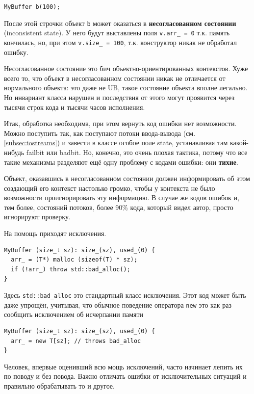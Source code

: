 \documentclass[a4paper,12pt,oneside]{book}
\begin{document}
\begin{lstlisting}
MyBuffer b(100);
\end{lstlisting}

После этой строчки объект \lstinline!b! может оказаться в \textbf{несогласованном состоянии} (inconsistent state). У него будут выставлены поля \lstinline!v.arr_ = 0! т.к. память кончилась, но, при этом \lstinline!v.size_ = 100!, т.к. конструктор никак не обработал ошибку. 

Несогласованное состояние это бич объектно-ориентированных контекстов. Хуже всего то, что объект в несогласованном состоянии никак не отличается от нормального объекта: это даже не UB, такое состояние объекта вполне легально. Но инвариант класса нарушен и последствия от этого могут проявится через тысячи строк кода и тысячи часов исполнения.

Итак, обработка необходима, при этом вернуть код ошибки нет возможности. Можно поступить так, как поступают потоки ввода-вывода (см. \ref{subsec:iostreams}) и завести в классе особое поле state, устанавливая там какой-нибудь failbit или badbit. Но, конечно, это очень плохая тактика, потому что все такие механизмы разделяют ещё одну проблему с кодами ошибки: они \textbf{тихие}.

Объект, оказавшись в несогласованном состоянии должен информировать об этом создающий его контекст настолько громко, чтобы у контекста не было возможности проигнорировать эту информацию. В случае же кодов ошибок и, тем более, состояний потоков, более 90\% кода, который видел автор, просто игнорируют проверку.

На помощь приходят исключения.

\begin{lstlisting}
MyBuffer (size_t sz): size_(sz), used_(0) {
  arr_ = (T*) malloc (sizeof(T) * sz);
  if (!arr_) throw std::bad_alloc();
}
\end{lstlisting}

Здесь \lstinline!std::bad_alloc! это стандартный класс исключения. Этот код может быть даже упрощён, учитывая, что обычное поведение оператора \lstinline!new! это как раз сообщить исключением об исчерпании памяти

\begin{lstlisting}
MyBuffer (size_t sz): size_(sz), used_(0) {
  arr_ = new T[sz]; // throws bad_alloc
}
\end{lstlisting}

Человек, впервые оценивший всю мощь исключений, часто начинает лепить их по поводу и без повода. Важно отличать ошибки от исключительных ситуаций и правильно обрабатывать то и другое.
\end{document}
